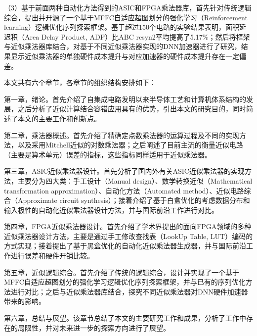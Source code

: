 （3）基于前面两种自动化方法得到的ASIC和FPGA乘法器库，首先针对传统逻辑综合，提出并开源了一个基于MFFC自适应超图划分的强化学习（Reinforcement learning）逻辑优化序列探索框架。基于超过150个电路的实验结果表明，面积延迟积（Area Delay Product, ADP）比ABC\cite{LS:ABC} resyn2平均提高了5.17\%；然后将框架与近似乘法器库结合，对基于不同近似乘法器实现的DNN加速器进行了研究，结果显示近似乘法器的单独硬件成本提升与对应加速器的硬件成本提升存在一定偏差。

本文共有六个章节，各章节的组织结构安排如下：

第一章，绪论。首先介绍了自集成电路发明以来半导体工艺和计算机体系结构的发展，之后分析了近似计算结合容错应用具有的优势，引出本文的研究目的，同时简述了本文的主要工作和创新点。

第二章，乘法器概述。首先介绍了精确定点数乘法器的运算过程及不同的实现方法，以及采用Mitchell近似的对数乘法器\cite{EM:mitchell}；之后阐述了目前主流的衡量近似电路（主要是算术单元）误差的指标，这些指标同样适用于近似乘法器。

第三章，ASIC近似乘法器设计。首先分析了国内外有关ASIC近似乘法器的实现方法，主要分为四大类：手工设计（Manual design）、数学转换近似（Mathematical transformation approximation）、自动化方法（Automated method）、近似电路综合（Approximate circuit synthesis）；接着介绍了基于白盒优化的考虑数据分布和输入极性的自动化近似乘法器设计方法，并与国际前沿工作进行对比。

第四章，FPGA近似乘法器设计。首先介绍了学术界提出的面向FPGA领域的多种近似乘法器设计方法，主要是通过手工修改查找表（LookUp Table, LUT）编码的方式实现；接着提出了基于黑盒优化的自动化近似乘法器生成器，并与国际前沿工作进行误差和硬件开销比较。

第五章，近似逻辑综合。首先介绍了传统的逻辑综合，设计并实现了一个基于MFFC自适应超图划分的强化学习逻辑优化序列探索框架，并与已有的序列优化方法进行对比；之后与近似乘法器库结合，探究不同近似乘法器对DNN硬件加速器带来的影响。

第六章，总结与展望。该章节总结了本文的主要研究工作和成果，分析了工作中存在的局限性，并对未来进一步的探索方向进行了展望。

